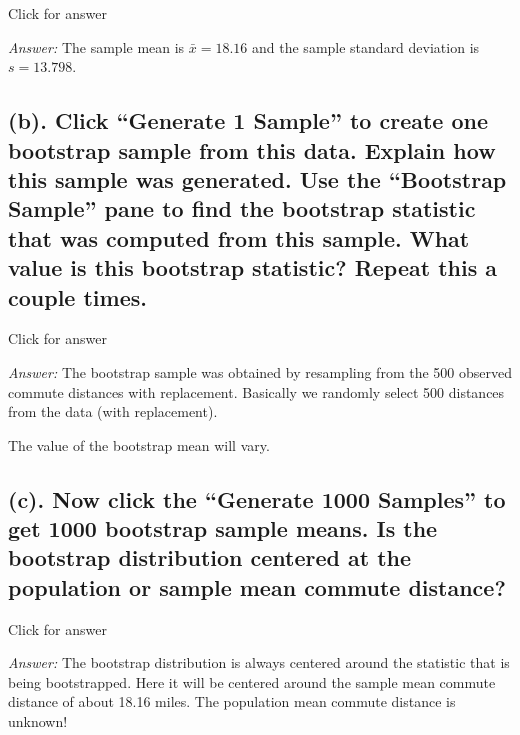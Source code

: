 \documentclass[
]{book}
\begin{document}
Click for answer

\emph{Answer:} The sample mean is \(\bar{x} = 18.16\) and the sample standard deviation is \(s = 13.798\).

\hypertarget{b.-click-generate-1-sample-to-create-one-bootstrap-sample-from-this-data.-explain-how-this-sample-was-generated.-use-the-bootstrap-sample-pane-to-find-the-bootstrap-statistic-that-was-computed-from-this-sample.-what-value-is-this-bootstrap-statistic-repeat-this-a-couple-times.}{%
\subsection{(b). Click ``Generate 1 Sample'' to create one bootstrap sample from this data. Explain how this sample was generated. Use the ``Bootstrap Sample'' pane to find the bootstrap statistic that was computed from this sample. What value is this bootstrap statistic? Repeat this a couple times.}\label{b.-click-generate-1-sample-to-create-one-bootstrap-sample-from-this-data.-explain-how-this-sample-was-generated.-use-the-bootstrap-sample-pane-to-find-the-bootstrap-statistic-that-was-computed-from-this-sample.-what-value-is-this-bootstrap-statistic-repeat-this-a-couple-times.}}

Click for answer

\emph{Answer:} The bootstrap sample was obtained by resampling from the 500 observed commute distances with
replacement. Basically we randomly select 500 distances from the data (with replacement).

The value of the bootstrap mean will vary.

\hypertarget{c.-now-click-the-generate-1000-samples-to-get-1000-bootstrap-sample-means.-is-the-bootstrap-distribution-centered-at-the-population-or-sample-mean-commute-distance}{%
\subsection{(c). Now click the ``Generate 1000 Samples'' to get 1000 bootstrap sample means. Is the bootstrap distribution centered at the population or sample mean commute distance?}\label{c.-now-click-the-generate-1000-samples-to-get-1000-bootstrap-sample-means.-is-the-bootstrap-distribution-centered-at-the-population-or-sample-mean-commute-distance}}

Click for answer

\emph{Answer:} The bootstrap distribution is always centered around the statistic that is being bootstrapped. Here it will be centered around the sample mean commute distance of about 18.16 miles. The population mean
commute distance is unknown!
\end{document}
